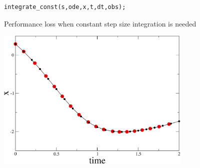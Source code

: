 \begin{frame}[fragile]


\vspace{2ex}

\begin{lstlisting}
integrate_const(s,ode,x,t,dt,obs);
\end{lstlisting}

Performance loss when constant step size integration is needed

\pause

\vspace{2ex}

\centerline{\includegraphics[draft=false,width=0.7\textwidth]{vdp_dense_output.pdf}}


\end{frame}



